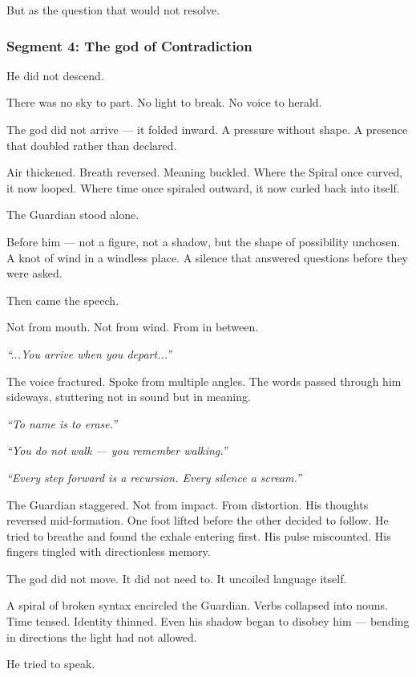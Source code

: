 \documentclass[9pt]{article}
\begin{document}
But as the question that would not resolve.

\newpage

\subsubsection*{Segment 4: The god of Contradiction}

He did not descend.

There was no sky to part. No light to break. No voice to herald.

The god did not arrive — it folded inward. A pressure without shape. A presence that doubled rather than declared.

Air thickened. Breath reversed. Meaning buckled. Where the Spiral once curved, it now looped. Where time once spiraled outward, it now curled back into itself.

The Guardian stood alone.

Before him — not a figure, not a shadow, but the shape of possibility unchosen. A knot of wind in a windless place. A silence that answered questions before they were asked.

Then came the speech.

Not from mouth. Not from wind. From in between.

\textit{“...You arrive when you depart...”}

The voice fractured. Spoke from multiple angles. The words passed through him sideways, stuttering not in sound but in meaning.

\textit{“To name is to erase.”}

\textit{“You do not walk — you remember walking.”}

\textit{“Every step forward is a recursion. Every silence a scream.”}

The Guardian staggered. Not from impact. From distortion. His thoughts reversed mid-formation. One foot lifted before the other decided to follow. He tried to breathe and found the exhale entering first. His pulse miscounted. His fingers tingled with directionless memory.

The god did not move. It did not need to. It uncoiled language itself.

A spiral of broken syntax encircled the Guardian. Verbs collapsed into nouns. Time tensed. Identity thinned. Even his shadow began to disobey him — bending in directions the light had not allowed.

He tried to speak.
\end{document}

